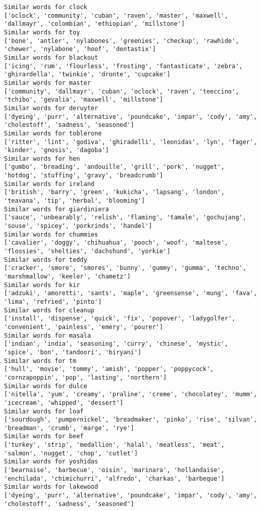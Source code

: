 \documentclass[11pt]{article}
\begin{document}
\begin{Verbatim}[commandchars=\\\{\}]
Similar words for clock
['oclock', 'community', 'cuban', 'raven', 'master', 'maxwell', 'dallmayr', 'colombian', 'ethiopian', 'millstone']
Similar words for toy
['bone', 'antler', 'nylabones', 'greenies', 'checkup', 'rawhide', 'chewer', 'nylabone', 'hoof', 'dentastix']
Similar words for blackout
['icing', 'rum', 'flourless', 'frosting', 'fantasticate', 'zebra', 'ghirardella', 'twinkie', 'dronte', 'cupcake']
Similar words for master
['community', 'dallmayr', 'cuban', 'oclock', 'raven', 'teeccino', 'tchibo', 'gevalia', 'maxwell', 'millstone']
Similar words for deruyter
['dyeing', 'purr', 'alternative', 'poundcake', 'impar', 'cody', 'amy', 'cholestoff', 'sadness', 'seasoned']
Similar words for toblerone
['ritter', 'lint', 'godiva', 'ghiradelli', 'leonidas', 'lyn', 'fager', 'kinder', 'gnosis', 'dagoba']
Similar words for hen
['gumbo', 'breading', 'andouille', 'grill', 'pork', 'nugget', 'hotdog', 'stuffing', 'gravy', 'breadcrumb']
Similar words for ireland
['british', 'barry', 'green', 'kukicha', 'lapsang', 'london', 'teavana', 'tip', 'herbal', 'blooming']
Similar words for giardiniera
['sauce', 'unbearably', 'relish', 'flaming', 'tamale', 'gochujang', 'souse', 'spicey', 'porkrinds', 'handel']
Similar words for chummies
['cavalier', 'doggy', 'chihuahua', 'pooch', 'woof', 'maltese', 'flossies', 'shelties', 'dachshund', 'yorkie']
Similar words for teddy
['cracker', 'smore', 'smores', 'bunny', 'gummy', 'gumma', 'techno', 'marshmallow', 'keeler', 'chametz']
Similar words for kir
['adzuki', 'amoretti', 'sants', 'maple', 'greensense', 'mung', 'fava', 'lima', 'refried', 'pinto']
Similar words for cleanup
['install', 'dispense', 'quick', 'fix', 'popover', 'ladygolfer', 'convenient', 'painless', 'emery', 'pourer']
Similar words for masala
['indian', 'india', 'seasoning', 'curry', 'chinese', 'mystic', 'spice', 'bon', 'tandoori', 'biryani']
Similar words for tm
['hull', 'movie', 'tommy', 'amish', 'popper', 'poppycock', 'cornzapoppin', 'pop', 'lasting', 'northern']
Similar words for dulce
['nitella', 'yum', 'creamy', 'praline', 'creme', 'chocolatey', 'mumm', 'icecream', 'whipped', 'dessert']
Similar words for loaf
['sourdough', 'pumpernickel', 'breadmaker', 'pinko', 'rise', 'silvan', 'breadman', 'crumb', 'marge', 'rye']
Similar words for beef
['turkey', 'strip', 'medallion', 'halal', 'meatless', 'meat', 'salmon', 'nugget', 'chop', 'cutlet']
Similar words for yoshidas
['bearnaise', 'barbecue', 'oisin', 'marinara', 'hollandaise', 'enchilada', 'chimichurri', 'alfredo', 'charkas', 'barbeque']
Similar words for lakewood
['dyeing', 'purr', 'alternative', 'poundcake', 'impar', 'cody', 'amy', 'cholestoff', 'sadness', 'seasoned']

\end{Verbatim}
\end{document}
